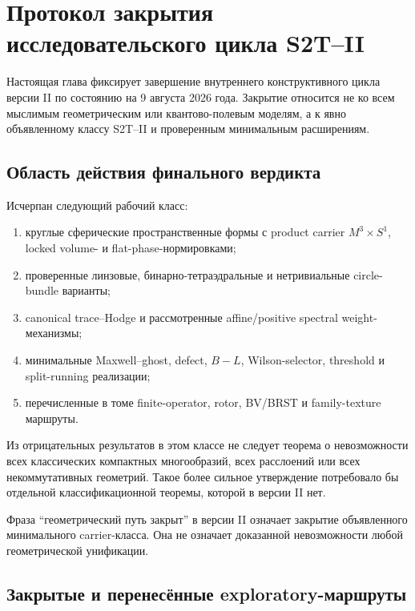 \chapter{Протокол закрытия исследовательского цикла S2T--II}

Настоящая глава фиксирует завершение внутреннего конструктивного цикла
версии II по состоянию на 9 августа 2026 года. Закрытие относится не ко всем
мыслимым геометрическим или квантово-полевым моделям, а к явно объявленному
классу S2T--II и проверенным минимальным расширениям.

\section{Область действия финального вердикта}

Исчерпан следующий рабочий класс:
\begin{enumerate}
 \item круглые сферические пространственные формы с product carrier
 \(M^3\times S^1\), locked volume- и flat-phase-нормировками;
 \item проверенные линзовые, бинарно-тетраэдральные и нетривиальные
 circle-bundle варианты;
 \item canonical trace--Hodge и рассмотренные affine/positive spectral
 weight-механизмы;
 \item минимальные Maxwell--ghost, defect, \(B-L\), Wilson-selector,
 threshold и split-running реализации;
 \item перечисленные в томе finite-operator, rotor, BV/BRST и
 family-texture маршруты.
\end{enumerate}
Из отрицательных результатов в этом классе не следует теорема о невозможности
всех классических компактных многообразий, всех расслоений или всех
некоммутативных геометрий. Такое более сильное утверждение потребовало бы
отдельной классификационной теоремы, которой в версии II нет.

\begin{nogocriterion}
Фраза ``геометрический путь закрыт'' в версии II означает закрытие
объявленного минимального carrier-класса. Она не означает доказанной
невозможности любой геометрической унификации.
\end{nogocriterion}

\section{Закрытые и перенесённые exploratory-маршруты}

